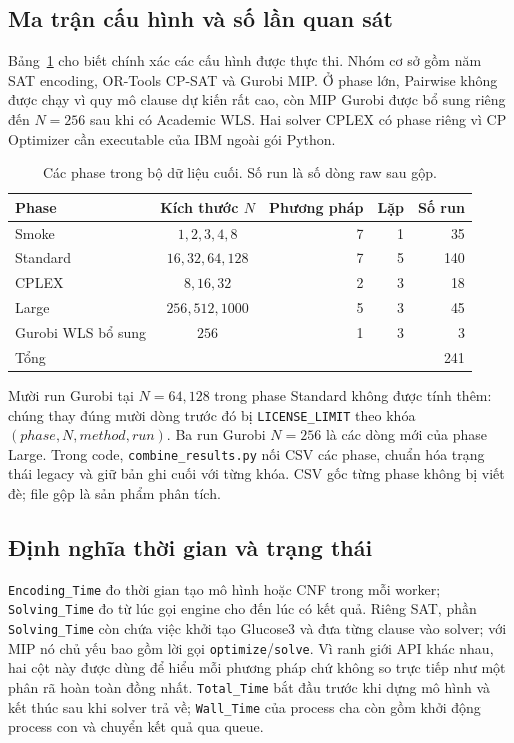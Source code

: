 \subsection{Ma trận cấu hình và số lần quan sát}

Bảng~\ref{tab:full-phases} cho biết chính xác các cấu hình được thực thi.
Nhóm cơ sở gồm năm SAT encoding, OR-Tools CP-SAT và Gurobi MIP.
Ở phase lớn, Pairwise không được chạy vì quy mô clause dự kiến rất cao,
còn MIP Gurobi được bổ sung riêng đến $N=256$ sau khi có Academic WLS.
Hai solver CPLEX có phase riêng vì CP Optimizer cần executable của IBM
ngoài gói Python.

\begin{table}[htbp]
\centering
\caption{Các phase trong bộ dữ liệu cuối. Số run là số dòng raw sau gộp.}
\label{tab:full-phases}
\begin{tabular}{lcrrr}
\toprule
Phase & Kích thước $N$ & Phương pháp & Lặp & Số run \\
\midrule
Smoke & $1,2,3,4,8$ & 7 & 1 & 35 \\
Standard & $16,32,64,128$ & 7 & 5 & 140 \\
CPLEX & $8,16,32$ & 2 & 3 & 18 \\
Large & $256,512,1000$ & 5 & 3 & 45 \\
Gurobi WLS bổ sung & $256$ & 1 & 3 & 3 \\
\midrule
Tổng & & & & 241 \\
\bottomrule
\end{tabular}
\end{table}

Mười run Gurobi tại $N=64,128$ trong phase Standard không được tính thêm:
chúng thay đúng mười dòng trước đó bị \texttt{LICENSE\_LIMIT} theo khóa
$(phase,N,method,run)$. Ba run Gurobi $N=256$ là các dòng mới của phase
Large. Trong code, \texttt{combine\_results.py} nối CSV các phase, chuẩn
hóa trạng thái legacy và giữ bản ghi cuối với từng khóa. CSV gốc từng phase
không bị viết đè; file gộp là sản phẩm phân tích.

\subsection{Định nghĩa thời gian và trạng thái}

\texttt{Encoding\_Time} đo thời gian tạo mô hình hoặc CNF trong mỗi worker;
\texttt{Solving\_Time} đo từ lúc gọi engine cho đến lúc có kết quả.
Riêng SAT, phần \texttt{Solving\_Time} còn chứa việc khởi tạo Glucose3 và
đưa từng clause vào solver; với MIP nó chủ yếu bao gồm lời gọi
\texttt{optimize}/\texttt{solve}. Vì ranh giới API khác nhau, hai cột này
được dùng để hiểu mỗi phương pháp chứ không so trực tiếp như một phân rã
hoàn toàn đồng nhất. \texttt{Total\_Time} bắt đầu trước khi dựng mô hình và
kết thúc sau khi solver trả về; \texttt{Wall\_Time} của process cha còn gồm
khởi động process con và chuyển kết quả qua queue.

